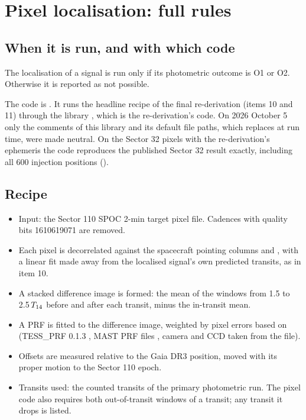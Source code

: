 \section{Pixel localisation: full rules} \label{app:localisation}

\subsection{When it is run, and with which code}

The localisation of a signal is run only if its photometric outcome is O1 or O2. Otherwise it is reported as not
possible.

The code is . It runs the headline recipe of the final re-derivation (items 10 and 11) through
the library , which is the re-derivation's code. On 2026 October 5 only the comments of this
library and its default file paths, which  replaces at run time, were made neutral. On the
Sector 32 pixels with the re-derivation's ephemeris the code reproduces the published Sector 32 result exactly,
including all 600 injection positions ().

\subsection{Recipe}

\begin{itemize}
\item Input: the Sector 110 SPOC 2-min target pixel file. Cadences with quality bits 1610619071 are removed.
\item Each pixel is decorrelated against the spacecraft pointing columns  and , with
  a linear fit made away from the localised signal's own predicted transits, as in item 10.
\item A stacked difference image is formed: the mean of the windows from 1.5 to 2.5\,$T_{14}$ before and after each
  transit, minus the in-transit mean.
\item A PRF is fitted to the difference image, weighted by pixel errors based on  (TESS\_PRF 0.1.3
  \citep{Bell2022}, MAST PRF files , camera and CCD taken from the file).
\item Offsets are measured relative to the Gaia DR3 position, moved with its proper motion to the Sector 110 epoch.
\item Transits used: the counted transits of the primary photometric run. The pixel code also requires both
  out-of-transit windows of a transit; any transit it drops is listed.
\end{itemize}


